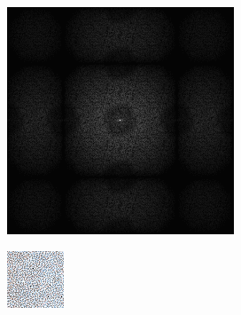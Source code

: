 \begin{figure}[H]
\begin{tcolorbox}[boxrule=4pt,sharp corners=downhill,title=Sortieren]
\begin{subfigure}[b]{0.2\textwidth}
        \includegraphics[width=\textwidth]{content/TemporalerAlg/Bilder/Sorting/Spektren/Ausschnitt6.png}
        \label{pic:sorting_t6_FFT}
    \end{subfigure}
    \begin{subfigure}[b]{0.2\textwidth}
        \centering
        \includegraphics[width=\textwidth]{content/TemporalerAlg/Bilder/Sorting/Ausschnitte/Ausschnitt3.png}

\end{subfigure}
\end{tcolorbox}
\end{figure}
